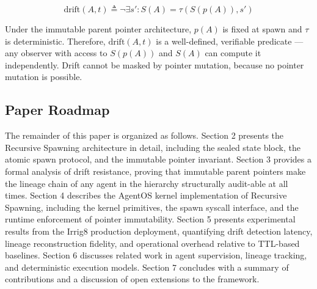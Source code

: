 \[
\text{drift}(A, t) \triangleq \neg \exists s' : S(A) = \tau(S(p(A)), s')
\]

Under the immutable parent pointer architecture, $p(A)$ is fixed at spawn and $\tau$ is deterministic. Therefore, $\text{drift}(A, t)$ is a well-defined, verifiable predicate — any observer with access to $S(p(A))$ and $S(A)$ can compute it independently. Drift cannot be masked by pointer mutation, because no pointer mutation is possible.

\subsection{Paper Roadmap}

The remainder of this paper is organized as follows. Section 2 presents the Recursive Spawning architecture in detail, including the sealed state block, the atomic spawn protocol, and the immutable pointer invariant. Section 3 provides a formal analysis of drift resistance, proving that immutable parent pointers make the lineage chain of any agent in the hierarchy structurally audit-able at all times. Section 4 describes the AgentOS kernel implementation of Recursive Spawning, including the kernel primitives, the spawn syscall interface, and the runtime enforcement of pointer immutability. Section 5 presents experimental results from the Irrig8 production deployment, quantifying drift detection latency, lineage reconstruction fidelity, and operational overhead relative to TTL-based baselines. Section 6 discusses related work in agent supervision, lineage tracking, and deterministic execution models. Section 7 concludes with a summary of contributions and a discussion of open extensions to the framework.
